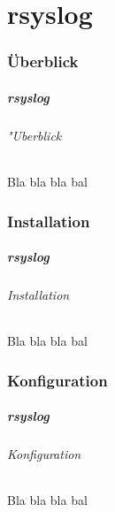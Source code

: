 \part{rsyslog}
\section{Überblick}
\begin{frame}
	\frametitle{rsyslog}
	\framesubtitle{"Uberblick}
	Bla bla bla bal 
\end{frame}
\section{Installation}
\begin{frame}
	\frametitle{rsyslog}
	\framesubtitle{Installation}
	Bla bla bla bal 
\end{frame}
\section{Konfiguration}
\begin{frame}
	\frametitle{rsyslog}
	\framesubtitle{Konfiguration}
	Bla bla bla bal 
\end{frame}
